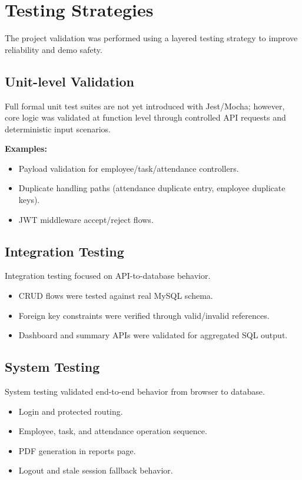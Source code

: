 \chapter{Testing Strategies}

The project validation was performed using a layered testing strategy to improve reliability and demo safety.

\section{Unit-level Validation}
Full formal unit test suites are not yet introduced with Jest/Mocha; however, core logic was validated at function level through controlled API requests and deterministic input scenarios.

\textbf{Examples:}
\begin{itemize}[leftmargin=1.3cm]
\item Payload validation for employee/task/attendance controllers.
\item Duplicate handling paths (attendance duplicate entry, employee duplicate keys).
\item JWT middleware accept/reject flows.
\end{itemize}

\section{Integration Testing}
Integration testing focused on API-to-database behavior.
\begin{itemize}[leftmargin=1.3cm]
\item CRUD flows were tested against real MySQL schema.
\item Foreign key constraints were verified through valid/invalid references.
\item Dashboard and summary APIs were validated for aggregated SQL output.
\end{itemize}

\section{System Testing}
System testing validated end-to-end behavior from browser to database.
\begin{itemize}[leftmargin=1.3cm]
\item Login and protected routing.
\item Employee, task, and attendance operation sequence.
\item PDF generation in reports page.
\item Logout and stale session fallback behavior.
\end{itemize}

